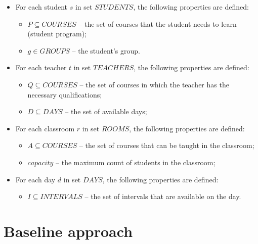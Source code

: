 \documentclass{article}
\begin{document}
\begin{itemize}
    \setlength\itemsep{0.05em}
    \item For each student $s$ in set $STUDENTS$, the following properties are defined:
    \begin{itemize}
        \setlength\itemsep{0.05em}
        \item $P \subseteq COURSES$ -- the set of courses that the student needs to learn (student program);
        \item $g \in GROUPS$ -- the student's group.
    \end{itemize}

    \item For each teacher $t$ in set $TEACHERS$, the following properties are defined:
    \begin{itemize}
        \setlength\itemsep{0.05em}
        \item $Q \subseteq COURSES$ -- the set of courses in which the teacher has the necessary qualifications;
        \item $D \subseteq DAYS$ -- the set of available days;
    \end{itemize}
    
    \item For each classroom $r$ in set $ROOMS$, the following properties are defined:
    \begin{itemize}
        \setlength\itemsep{0.05em}
        \item $A \subseteq COURSES$ -- the set of courses that can be taught in the classroom;
        \item $capacity$ -- the maximum count of students in the classroom;
    \end{itemize}

    \item For each day $d$ in set $DAYS$, the following properties are defined:
    \begin{itemize}
        \setlength\itemsep{0.05em}
        \item $I \subseteq INTERVALS$ -- the set of intervals that are available on the day.
    \end{itemize}

\end{itemize}

\section{Baseline approach}





\end{document}
